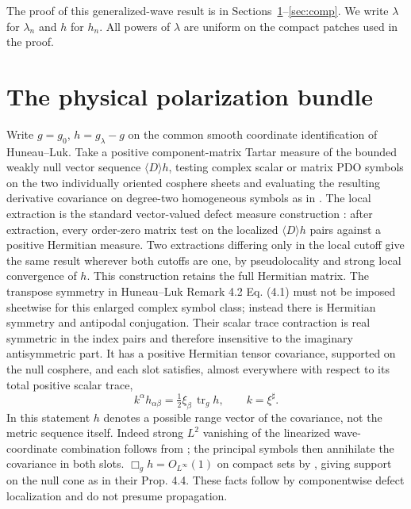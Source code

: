 \documentclass[11pt]{article}
\begin{document}
The proof of this generalized-wave result is in Sections~\ref{sec:bundle}--\ref{sec:comp}. We write \(\lambda\) for \(\lambda_n\) and \(h\) for \(h_n\). All powers of \(\lambda\) are uniform on the compact patches used in the proof.

\section{The physical polarization bundle}
\label{sec:bundle}
Write \(g=g_0\), \(h=g_\lambda-g\) on the common smooth coordinate identification of Huneau--Luk. Take a positive component-matrix Tartar measure of the bounded weakly null vector sequence \(\langle D\rangle h\), testing complex scalar or matrix PDO symbols on the two individually oriented cosphere sheets and evaluating the resulting derivative covariance on degree-two homogeneous symbols as in \cite[Eq.~(1.5)]{HL}. The local extraction is the standard vector-valued defect measure construction \cite{Gerard,Tartar}: after extraction, every order-zero matrix test on the localized \(\langle D\rangle h\) pairs against a positive Hermitian measure. Two extractions differing only in the local cutoff give the same result wherever both cutoffs are one, by pseudolocality and strong local convergence of \(h\). This construction retains the full Hermitian matrix. The transpose symmetry in Huneau--Luk Remark 4.2 Eq. (4.1) must not be imposed sheetwise for this enlarged complex symbol class; instead there is Hermitian symmetry and antipodal conjugation. Their scalar trace contraction is real symmetric in the index pairs and therefore insensitive to the imaginary antisymmetric part. It has a positive Hermitian tensor covariance, supported on the null cosphere, and each slot satisfies, almost everywhere with respect to its total positive scalar trace,
\[
 k^\alpha h_{\alpha\beta}=\tfrac12\xi_\beta\,\operatorname{tr}_g h,\qquad
 k=\xi^\sharp.
\]
In this statement \(h\) denotes a possible range vector of the covariance, not the metric sequence itself. Indeed strong \(L^2\) vanishing of the linearized wave-coordinate combination follows from \cite[Eq.~(3.4)]{HL}; the principal symbols then annihilate the covariance in both slots. \(\Box_g h=O_{L^\infty}(1)\) on compact sets by \cite[Eq.~(3.16)]{HL}, giving support on the null cone as in their Prop. 4.4. These facts follow by componentwise defect localization and do not presume propagation.
\end{document}
